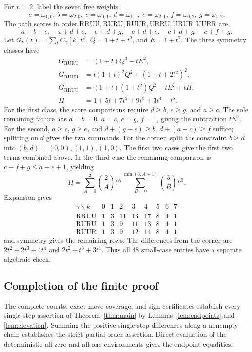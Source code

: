 \documentclass[11pt,a4paper]{article}
\newcommand{\R}{\mathrm R}
\newcommand{\U}{\mathrm U}
\begin{document}
For $n=2$, label the seven free weights
\[
a=\omega_{1,0},\ b=\omega_{2,0},\ c=\omega_{0,1},\
d=\omega_{1,1},\ e=\omega_{2,1},\ f=\omega_{0,2},\ g=\omega_{1,2}.
\]
The path scores in order
$\R\R\U\U,\R\U\R\U,\R\U\U\R,\U\R\R\U,\U\R\U\R,\U\U\R\R$
are
\[
 a+b+e,\quad a+d+e,\quad a+d+g,\quad
 c+d+e,\quad c+d+g,\quad c+f+g.
\]
Let $G_\gamma(t)=\sum_k C_\gamma[k]t^k$,
$Q=1+t+t^2$, and $E=1+t^2$. The three symmetry classes have
\begin{align*}
G_{\R\U\R\U}&=(1+t)Q^3-tE^2,\\
G_{\R\U\U\R}&=t(1+t)^2Q^2+(1+t+2t^2)^2,\\
G_{\R\R\U\U}&=(1+t)(1+t^2)Q^2-tE^2+tH,\\
H&=1+5t+7t^2+9t^3+3t^4+t^5.
\end{align*}
For the first class, the score comparisons require $d\geq b$,
$e\geq g$, and $a\geq c$. The sole remaining failure has
$d=b=0$, $a=c$, $e=g$, $f=1$, giving the subtraction $tE^2$.
For the second, $a\geq c$, $g\geq e$, and
$d+(g-e)\geq b$, $d+(a-c)\geq f$ suffice; splitting on $d$ gives
the two summands. For the corner, split the constraint $b\geq d$
into $(b,d)=(0,0),(1,1),(1,0)$. The first two cases give the first
two terms combined above. In the third case the remaining comparison
is $c+f+g\leq a+e+1$, yielding
\[
H=\sum_{A=0}^2\binom2A t^A
       \sum_{B=0}^{\min(3,A+1)}\binom3B t^B.
\]
Expansion gives
\[
\begin{array}{c|rrrrrrrr}
\gamma\backslash k&0&1&2&3&4&5&6&7\\\hline
\R\R\U\U&1&3&11&13&17&8&4&1\\
\R\U\R\U&1&3&9&11&13&8&4&1\\
\R\U\U\R&1&3&9&12&14&8&4&1
\end{array}
\]
and symmetry gives the remaining rows. The differences from the corner
are $2t^2+2t^3+4t^4$ and $2t^2+t^3+3t^4$. Thus all 48 small-case
entries have a separate algebraic check.

\subsection{Completion of the finite proof}
The complete counts, exact move coverage, and sign certificates establish
every single-step assertion of Theorem~\ref{thm:main} by
Lemmas~\ref{lem:endpoints} and \ref{lem:elevation}. Summing the positive
single-step differences along a nonempty chain establishes the strict
partial-order assertion. Direct evaluation of the deterministic all-zero
and all-one environments gives the endpoint equalities.
\end{document}
